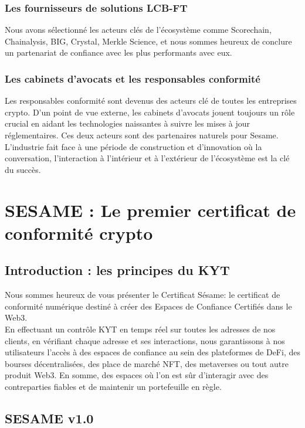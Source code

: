 ﻿\documentclass[a4paper]{article}
\let\OldTexttrademark\texttrademark
\renewcommand{\texttrademark}{\OldTexttrademark\xspace}%
\begin{document}
\subsubsection{Les fournisseurs de solutions LCB-FT}
Nous avons sélectionné les acteurs clés de l'écosystème comme Scorechain, Chainalysis, BIG, Crystal, Merkle Science,  et nous sommes heureux de conclure un partenariat de confiance avec les plus performants avec eux.

\subsubsection{Les cabinets d’avocats et les responsables conformité}
Les responsables conformité sont devenus des acteurs clé de toutes les entreprises crypto. D’un point de vue externe, les cabinets d'avocats jouent toujours un rôle crucial en aidant les technologies naissantes à suivre les mises à jour réglementaires. 
Ces deux acteurs sont des partenaires naturels pour Sesame. L'industrie fait face à une période de construction et d'innovation où la conversation, l'interaction à l'intérieur et à l'extérieur de l'écosystème est la clé du succès.

\newpage
\section{SESAME : Le premier certificat de conformité crypto}
\subsection{Introduction : les principes du KYT}
Nous sommes heureux de vous présenter le Certificat Sésame: le certificat de conformité numérique destiné à créer des Espaces de Confiance Certifiés\texttrademark dans le Web3. \\

En effectuant un contrôle KYT en temps réel sur toutes les adresses de nos clients, en vérifiant chaque adresse et ses interactions, nous garantissons à nos utilisateurs l'accès à des espaces de confiance au sein des plateformes de DeFi, des bourses décentralisées, des place de marché NFT, des metaverses ou tout autre produit Web3. En somme, des espaces où l'on est sûr d'interagir avec des contreparties fiables et de maintenir un portefeuille en règle.

\subsection{SESAME v1.0}
\end{document}
